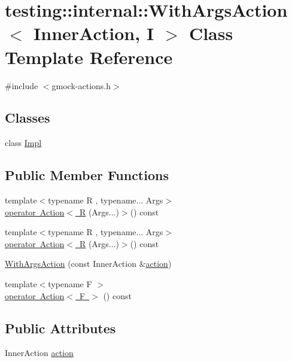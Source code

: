 \hypertarget{structtesting_1_1internal_1_1_with_args_action}{}\section{testing\+::internal\+::With\+Args\+Action$<$ Inner\+Action, I $>$ Class Template Reference}
\label{structtesting_1_1internal_1_1_with_args_action}


{\ttfamily \#include $<$gmock-\/actions.\+h$>$}

\subsection*{Classes}
\begin{DoxyCompactItemize}
\item 
class \mbox{\hyperlink{classtesting_1_1internal_1_1_with_args_action_1_1_impl}{Impl}}
\end{DoxyCompactItemize}
\subsection*{Public Member Functions}
\begin{DoxyCompactItemize}
\item 
{\footnotesize template$<$typename R , typename... Args$>$ }\\\mbox{\hyperlink{structtesting_1_1internal_1_1_with_args_action_a2c4bbb449ac39c58035fa85c2716ee64}{operator Action$<$ R}} (Args...)$>$() const
\item 
{\footnotesize template$<$typename R , typename... Args$>$ }\\\mbox{\hyperlink{structtesting_1_1internal_1_1_with_args_action_a2c4bbb449ac39c58035fa85c2716ee64}{operator Action$<$ R}} (Args...)$>$() const
\item 
\mbox{\hyperlink{structtesting_1_1internal_1_1_with_args_action_a506fcbb1bccdf29c89b44af65adb4c14}{With\+Args\+Action}} (const Inner\+Action \&\mbox{\hyperlink{structtesting_1_1internal_1_1_with_args_action_af1676990dc34762bb0eab2ff6047cf52}{action}})
\item 
{\footnotesize template$<$typename F $>$ }\\\mbox{\hyperlink{structtesting_1_1internal_1_1_with_args_action_a3d2c6043bc1a67611271624805522422}{operator Action$<$ F $>$}} () const
\end{DoxyCompactItemize}
\subsection*{Public Attributes}
\begin{DoxyCompactItemize}
\item 
Inner\+Action \mbox{\hyperlink{structtesting_1_1internal_1_1_with_args_action_af1676990dc34762bb0eab2ff6047cf52}{action}}
\end{DoxyCompactItemize}
